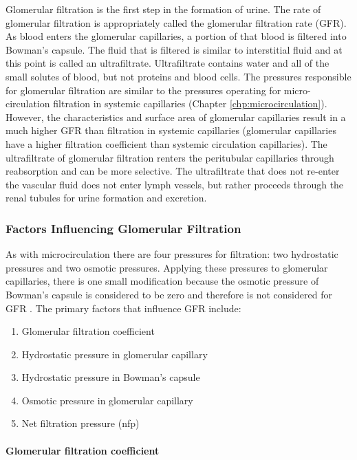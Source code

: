 Glomerular filtration is the first step in the formation of urine. The rate of glomerular filtration is appropriately called the glomerular filtration rate (GFR). As blood enters the glomerular capillaries, a portion of that blood is filtered into Bowman’s capsule. The fluid that is filtered is similar to interstitial fluid and at this point is called an ultrafiltrate. Ultrafiltrate contains water and all of the small solutes of blood, but not proteins and blood cells. The pressures responsible for glomerular filtration are similar to the pressures operating for micro-circulation filtration in systemic capillaries (Chapter \ref{chp:microcirculation}). However, the characteristics and surface area of glomerular capillaries result in a much higher GFR than filtration in systemic capillaries (glomerular capillaries have a higher filtration coefficient than systemic circulation capillaries). The ultrafiltrate of glomerular filtration renters the peritubular capillaries through reabsorption and can be more selective. The ultrafiltrate that does not re-enter the vascular fluid does not enter lymph vessels, but rather proceeds through the renal tubules for urine formation and excretion.

\subsubsection{Factors Influencing Glomerular Filtration}

As with microcirculation there are four pressures for filtration: two hydrostatic pressures and two osmotic pressures. Applying these pressures to glomerular capillaries, there is one small modification because the osmotic pressure of Bowman’s capsule is considered to be zero and therefore is not considered for GFR \cite{costanzo_physiology_2013}. The primary factors that influence GFR include:

\begin{enumerate}
\item Glomerular filtration coefficient
\item Hydrostatic pressure in glomerular capillary
\item Hydrostatic pressure in Bowman’s capsule
\item Osmotic pressure in glomerular capillary
\item Net filtration pressure (nfp)
\end{enumerate} 

\paragraph{Glomerular filtration coefficient}

